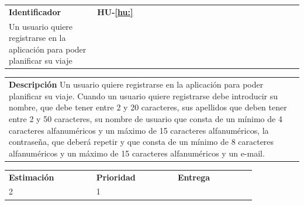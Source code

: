 \documentclass[11pt]{article}
\begin{document}
\begin{table}[H]
  \centering
  \begin{tabular}{p{0.3\linewidth}|p{0.7\linewidth}}
    \toprule
    \textbf{Identificador} & \textbf{HU-\ref{hu:}}\\
    Un usuario quiere registrarse en la aplicación para poder planificar su viaje
    \bottomrule
  \end{tabular}

  \begin{tabular}{p{1.028\linewidth}}
    \textbf{Descripción}
    \midrule
    Un usuario quiere registrarse en la aplicación para poder planificar su viaje. Cuando un usuario quiere registrarse debe introducir su nombre, que debe tener entre 2 y 20 caracteres, sus apellidos que deben tener entre 2 y 50 caracteres, su nombre de usuario que consta de un mínimo de 4 caracteres alfanuméricos y un máximo de 15 caracteres alfanuméricos, la contraseña, que deberá repetir y que consta de un mínimo de 8 caracteres alfanuméricos y un máximo de 15 caracteres alfanuméricos y un e-mail.
  \end{tabular}

  \begin{tabular}{p{0.18\linewidth}|p{0.1\linewidth}|p{0.18\linewidth}|p{0.1\linewidth}|p{0.18\linewidth}|p{0.1\linewidth}}
    \toprule
    \textbf{Estimación} & & \textbf{Prioridad} & & \textbf{Entrega} & \\
    2 && 1 && \\
    \bottomrule
  \end{tabular}


\end{table}
\end{document}
